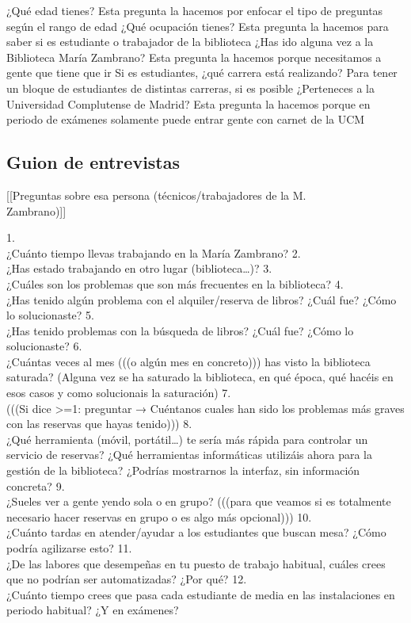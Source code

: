 \documentclass[12pt]{article}
\begin{document}
¿Qué edad tienes?
Esta pregunta la hacemos por enfocar el tipo de preguntas según el rango de edad 
¿Qué ocupación tienes?
Esta pregunta la hacemos para saber si es estudiante o trabajador de la biblioteca 
¿Has ido alguna vez a la Biblioteca María Zambrano?
Esta pregunta la hacemos porque necesitamos a gente que tiene que ir
Si es estudiantes, ¿qué carrera está realizando?
Para tener un bloque de estudiantes de distintas carreras, si es posible
¿Perteneces a la Universidad Complutense de Madrid?
Esta pregunta la hacemos porque en periodo de exámenes solamente puede entrar gente con carnet de la UCM



\subsection{Guion de entrevistas}

[[Preguntas sobre esa persona (técnicos/trabajadores de la M.\\ Zambrano)]] 

1.\\ ¿Cuánto tiempo llevas trabajando en la María Zambrano? 
2.\\ ¿Has estado trabajando en otro lugar (biblioteca…)? 
3.\\ ¿Cuáles son los problemas que son más frecuentes en la biblioteca? 
4.\\ ¿Has tenido algún problema con el alquiler/reserva de libros? ¿Cuál fue? ¿Cómo lo solucionaste?
5.\\ ¿Has tenido problemas con la búsqueda de libros? ¿Cuál fue? ¿Cómo lo solucionaste?
6.\\ ¿Cuántas veces al mes (((o algún mes en concreto))) has visto la biblioteca saturada? (Alguna vez se ha saturado la biblioteca, en qué época, qué hacéis en esos casos y como solucionais la saturación)
7.\\ (((Si dice >=1: preguntar → Cuéntanos cuales han sido los problemas más graves con las reservas que hayas tenido)))
8.\\ ¿Qué herramienta (móvil, portátil…) te sería más rápida para controlar un servicio de reservas? ¿Qué herramientas informáticas utilizáis ahora para la gestión de la biblioteca? ¿Podrías mostrarnos la interfaz, sin información concreta? 
9.\\ ¿Sueles ver a gente yendo sola o en grupo? (((para que veamos si es totalmente necesario hacer reservas en grupo o es algo más opcional))) 
10.\\ ¿Cuánto tardas en atender/ayudar a los estudiantes que buscan mesa? ¿Cómo podría agilizarse esto? 
11.\\ ¿De las labores que desempeñas en tu puesto de trabajo habitual, cuáles crees que no podrían ser automatizadas? ¿Por qué? 
12.\\ ¿Cuánto tiempo crees que pasa cada estudiante de media en las instalaciones en periodo habitual? ¿Y en exámenes? 
\end{document}
